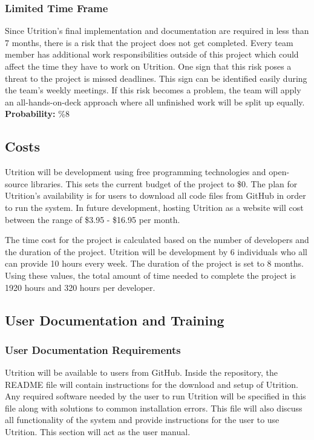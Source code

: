\documentclass[12pt]{article}
\begin{document}
{\subsubsection{Limited Time Frame}
Since Utrition's final implementation and documentation are required in less than 7 months, there is a risk that the project does not get completed. Every team member has additional work responsibilities outside of this project which could affect the time they have to work on Utrition. One sign that this risk poses a threat to the project is missed deadlines. This sign can be identified easily during the team's weekly meetings. If this risk becomes a problem, the team will apply an all-hands-on-deck approach where all unfinished work will be split up equally.\newline
\textbf{Probability:} \%8

\subsection{Costs}
Utrition will be development using free programming technologies and open-source libraries. This sets the current budget of the project to \$0. The plan for Utrition's availability is for users to download all code files from GitHub in order to run the system. In future development, hosting Utrition as a website will cost between the range of \$3.95 - \$16.95 per month.

The time cost for the project is calculated based on the number of developers and the duration of the project. Utrition will be development by 6 individuals who all can provide 10 hours every week. The duration of the project is set to 8 months. Using these values, the total amount of time needed to complete the project is 1920 hours and 320 hours per developer.

\subsection{User Documentation and Training}
\subsubsection{User Documentation Requirements}
Utrition will be available to users from GitHub. Inside the repository, the README file will contain instructions for the download and setup of Utrition. Any required software needed by the user to run Utrition will be specified in this file along with solutions to common installation errors. This file will also discuss all functionality of the system and provide instructions for the user to use Utrition. This section will act as the user manual. 

}
\end{document}
